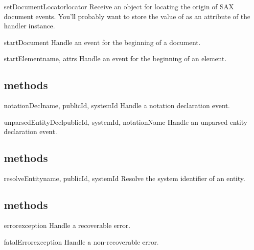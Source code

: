 \documentclass{howto}
\begin{document}
\begin{methoddesc}{setDocumentLocator}{locator}
Receive 
an object for locating the origin of SAX document events.  You'll probably want to store the value of  as an attribute of the handler instance.
\end{methoddesc}

\begin{methoddesc}{startDocument}{}
Handle an event for the beginning of a document.
\end{methoddesc}

\begin{methoddesc}{startElement}{name, attrs}
Handle an event for the beginning of an element.
\end{methoddesc}


\subsection{ methods}

\begin{methoddesc}{notationDecl}{name, publicId, systemId}
Handle a notation declaration event.
\end{methoddesc}

\begin{methoddesc}{unparsedEntityDecl}{publicId, systemId, notationName}
Handle an unparsed entity declaration event.
\end{methoddesc}


\subsection{ methods}

\begin{methoddesc}{resolveEntity}{name, publicId, systemId}
Resolve the system identifier of an entity.
\end{methoddesc}

\subsection{ methods}

\begin{methoddesc}{error}{exception}
Handle a recoverable error.
\end{methoddesc}

\begin{methoddesc}{fatalError}{exception}
Handle a non-recoverable error.
\end{methoddesc}
\end{document}
